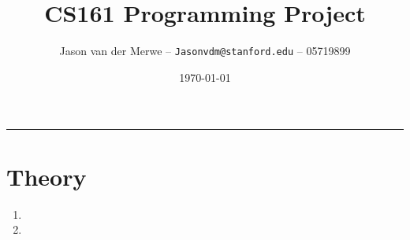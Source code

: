 \documentclass[12pt]{article}
\title{CS161 Programming Project}
\author{Jason van der Merwe -- \texttt{Jasonvdm@stanford.edu} -- 05719899}
\date{\today}
\begin{document}
\maketitle

\vspace{-0.3in}
\rule{\linewidth}{0.4pt}


\section*{Theory}
\begin{enumerate}
    \item 
    \item 
    

\end{enumerate}
\end{document}
